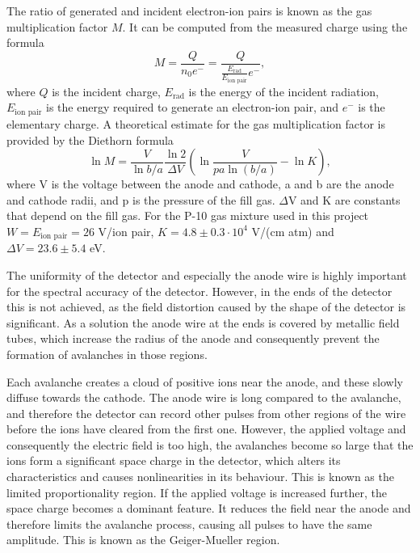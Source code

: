 \documentclass[a4paper]{article}
\begin{document}
The ratio of generated and incident electron-ion pairs is known as the gas multiplication factor $M$.
It can be computed from the measured charge using the formula
\begin{equation}
M = \frac{Q}{n_0 e^-} = \frac{Q}{\frac{E_\text{rad}}{E_\text{ion pair}} e^-},
\label{eq:gas_mult}
\end{equation}
where $Q$ is the incident charge, $E_\text{rad}$ is the energy of the incident radiation, $E_\text{ion pair}$ is the energy required to generate an electron-ion pair, and $e^-$ is the elementary charge.
A theoretical estimate for the gas multiplication factor is provided by the Diethorn formula \cite[eq. 6.10]{knoll_radiation_2010}
\begin{equation}
\ln M = \frac{V}{\ln b/a} \frac{\ln 2}{\Delta V}
\left( \ln \frac{V}{pa \ln (b/a)} - \ln K \right),
\label{eq:diethorn}
\end{equation}
where V is the voltage between the anode and cathode, a and b are the anode and cathode radii, and p is the pressure of the fill gas.
$\Delta$V and K are constants that depend on the fill gas.
For the P-10 gas mixture used in this project $W = E_\text{ion pair} = 26$ V/ion pair, $K = 4.8 \pm 0.3 \cdot 10^4$ V/(cm atm) and $\Delta V = 23.6 \pm 5.4$ eV.
\cites{winkler_gaseous_2015}{knoll_radiation_2010}

The uniformity of the detector and especially the anode wire is highly important for the spectral accuracy of the detector.
However, in the ends of the detector this is not achieved, as the field distortion caused by the shape of the detector is significant.
As a solution the anode wire at the ends is covered by metallic field tubes, which increase the radius of the anode and consequently prevent the formation of avalanches in those regions.
\cites[p. 165]{knoll_radiation_2010}

Each avalanche creates a cloud of positive ions near the anode, and these slowly diffuse towards the cathode.
The anode wire is long compared to the avalanche, and therefore the detector can record other pulses from other regions of the wire before the ions have cleared from the first one.
However, the applied voltage and consequently the electric field is too high, the avalanches become so large that the ions form a significant space charge in the detector, which alters its characteristics and causes nonlinearities in its behaviour.
This is known as the limited proportionality region.
If the applied voltage is increased further, the space charge becomes a dominant feature.
It reduces the field near the anode and therefore limits the avalanche process, causing all pulses to have the same amplitude.
This is known as the Geiger-Mueller region.
\cite[p. 160--161]{knoll_radiation_2010}
\end{document}
